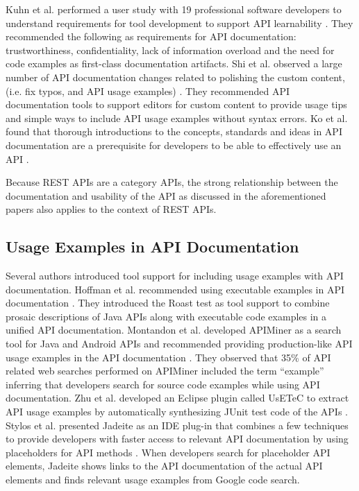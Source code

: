 \documentclass[10pt, conference]{IEEEtran}
\begin{document}
Kuhn et al. performed a user study with 19 professional software developers to understand requirements for tool development to support API learnability \cite{Kuhn_on_designing}. They recommended the following as requirements for API documentation: trustworthiness, confidentiality, lack of information overload and the need for code examples as first-class documentation artifacts. Shi et al. observed a large number of API documentation changes related to polishing the custom content, (i.e. fix typos, and API usage examples) \cite{shi2011empirical}. They recommended API documentation tools to support editors for custom content to provide usage tips and simple ways to include API usage examples without syntax errors. Ko et al. found that thorough introductions to the concepts, standards and ideas in API documentation are a prerequisite for developers to be able to effectively use an API  \cite{ko2011role}.

Because REST APIs are a category APIs, the strong relationship between the documentation and usability of the API as discussed in the aforementioned papers also applies to the context of REST APIs.

\subsection{Usage Examples in API Documentation} %


Several authors introduced tool support for including usage examples with API documentation. Hoffman et al. recommended using executable examples in API documentation \cite{Hoffman_api_documentation}. They introduced the Roast test as tool support to combine prosaic descriptions of Java APIs along with executable code examples in a unified API documentation. Montandon et al. developed APIMiner as a search tool for Java and Android APIs and recommended providing production-like API usage examples in the API documentation \cite{montandon2013documenting}. They observed that 35\% of API related web searches performed on APIMiner included the term ``example'' inferring that developers search for source code examples while using API documentation. Zhu et al. developed an Eclipse plugin called UsETeC to extract API usage examples by automatically synthesizing JUnit test code of the APIs \cite{zhu2014mining}. Stylos et al. presented Jadeite as an IDE plug-in that combines a few techniques to provide developers with faster access to relevant API documentation by using placeholders for API methods \cite{Jadeite}. When developers search for placeholder API elements, Jadeite shows links to the API documentation of the actual API elements and finds relevant usage examples from Google code search.
\end{document}
